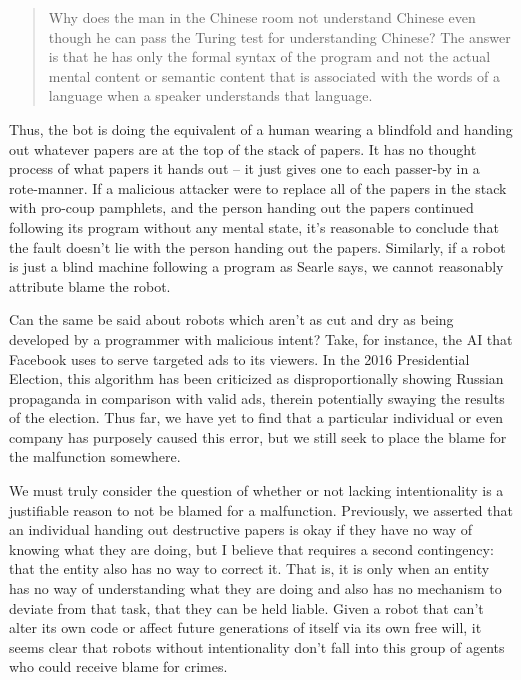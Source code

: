 \documentclass[12]{article}
\begin{document}
		\begin{quote}
			Why does the man in the Chinese room not understand Chinese even though he can pass the Turing test for understanding Chinese? The answer is that he has only the formal syntax of the program and not the actual mental content or semantic content that is associated with the words of a language when a speaker understands that language.
		\end{quote}
	
		Thus, the bot is doing the equivalent of a human wearing a blindfold and handing out whatever papers are at the top of the stack of papers. It has no thought process of what papers it hands out -- it just gives one to each passer-by in a rote-manner. If a malicious attacker were to replace all of the papers in the stack with pro-coup pamphlets, and the person handing out the papers continued following its program without any mental state, it's reasonable to conclude that the fault doesn't lie with the person handing out the papers. Similarly, if a robot is just a blind machine following a program as Searle says, we cannot reasonably attribute blame the robot. 
	
		Can the same be said about robots which aren't as cut and dry as being developed by a programmer with malicious intent? Take, for instance, the AI that Facebook uses to serve targeted ads to its viewers. In the 2016 Presidential Election, this algorithm has been criticized as disproportionally showing Russian propaganda\cite{facebook_russia} in comparison with valid ads, therein potentially swaying the results of the election. Thus far, we have yet to find that a particular individual or even company has purposely caused this error, but we still seek to place the blame for the malfunction somewhere.
	
		We must truly consider the question of whether or not lacking intentionality is a justifiable reason to not be blamed for a malfunction. Previously, we asserted that an individual handing out destructive papers is okay if they have no way of knowing what they are doing, but I believe that requires a second contingency: that the entity also has no way to correct it. That is, it is only when an entity has no way of understanding what they are doing and also has no mechanism to deviate from that task, that they can be held liable. Given a robot that can't alter its own code or affect future generations of itself via its own free will, it seems clear that robots without intentionality don't fall into this group of agents who could receive blame for crimes.
	
\end{document}
